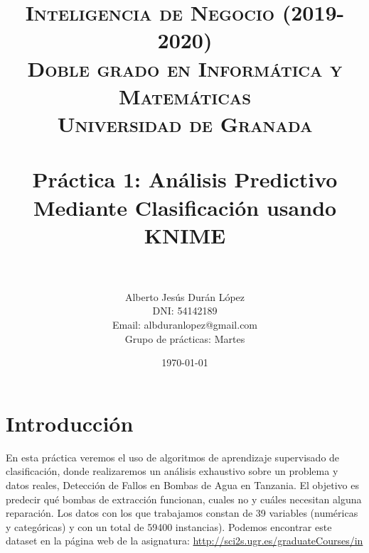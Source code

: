

\title{	
	\normalfont \normalsize 
	\textsc{\textbf{Inteligencia de Negocio (2019-2020)} \\ Doble grado en Informática y Matemáticas \\ Universidad de Granada} \\ [25pt] 
	\horrule{0.5pt} \\[0.4cm]
	\huge Práctica 1: Análisis Predictivo Mediante Clasificación usando KNIME \\ 
	\horrule{2pt} \\[0.5cm] 
}

\author{Alberto Jesús Durán López \\
	
		DNI: 54142189 \\
	    Email: albduranlopez@gmail.com \\
         Grupo de prácticas: Martes} 
\date{\normalsize\today}



	\maketitle       %
	\newpage 
	\tableofcontents %
	\newpage
	
	
	
	
	\section{Introducción}
	
	 \hspace{1cm}  En esta práctica veremos el uso de algoritmos de aprendizaje supervisado de clasificación, donde realizaremos un análisis exhaustivo sobre un problema y datos reales, Detección de Fallos en Bombas de Agua en Tanzania. El objetivo es predecir qué bombas de extracción funcionan, cuales no y cuáles necesitan alguna reparación. Los datos con los que trabajamos constan de 39 variables (numéricas y categóricas) y con un total de 59400 instancias). 
	Podemos encontrar este dataset en la página web de la asignatura: \href{url}{http://sci2s.ugr.es/graduateCourses/in} \\
	
